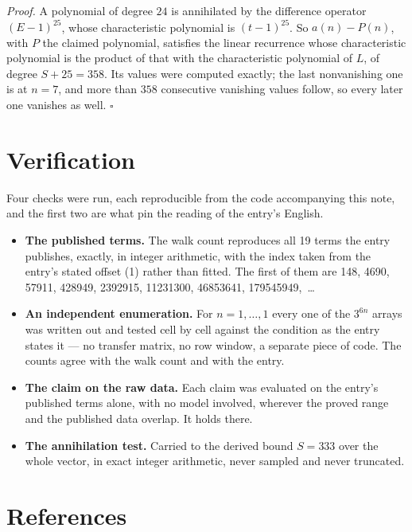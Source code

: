 \documentclass[11pt]{article}
\theoremstyle{definition}
\begin{document}
{\itshape Proof.} A polynomial of degree $24$ is annihilated by the difference operator $(E-1)^{25}$, whose characteristic polynomial is $(t-1)^{25}$. So $a(n) - P(n)$, with $P$ the claimed polynomial, satisfies the linear recurrence whose characteristic polynomial is the product of that with the characteristic polynomial of $L$, of degree $S + 25 = 358$. Its values were computed exactly; the last nonvanishing one is at $n = 7$, and more than $358$ consecutive vanishing values follow, so every later one vanishes as well. $\square$

\section{Verification}

Four checks were run, each reproducible from the code accompanying this note, and the first two are what pin the reading of the entry's English.

\begin{itemize}

\item {\bfseries The published terms.} The walk count reproduces all 19 terms the entry publishes, exactly, in integer arithmetic, with the index taken from the entry's stated offset (1) rather than fitted. The first of them are 148, 4690, 57911, 428949, 2392915, 11231300, 46853641, 179545949,~\dots

\item {\bfseries An independent enumeration.} For $n = 1,\dots,1$ every one of the $3^{6n}$ arrays was written out and tested cell by cell against the condition as the entry states it --- no transfer matrix, no row window, a separate piece of code. The counts agree with the walk count and with the entry.

\item {\bfseries The claim on the raw data.} Each claim was evaluated on the entry's published terms alone, with no model involved, wherever the proved range and the published data overlap. It holds there.

\item {\bfseries The annihilation test.} Carried to the derived bound $S = 333$ over the whole vector, in exact integer arithmetic, never sampled and never truncated.

\end{itemize}

\section{References}
\end{document}
